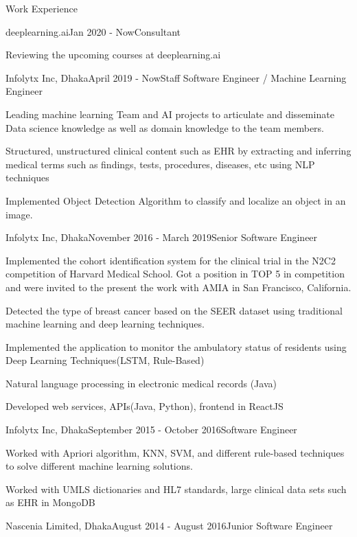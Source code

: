 \documentclass{resume} %
\begin{document}

\begin{rSection}{Work Experience}
\begin{rSubsection}{deeplearning.ai}{Jan 2020 - Now}{Consultant}{}
\item Reviewing the upcoming courses at deeplearning.ai 
\end{rSubsection}

\begin{rSubsection}{Infolytx Inc, Dhaka}{April 2019 - Now}{Staff Software Engineer / Machine Learning Engineer }{} 
\item Leading machine learning Team and AI projects to articulate and disseminate Data science knowledge as well as domain knowledge to the team members.
\item Structured, unstructured clinical content such as EHR by extracting and inferring medical terms such as findings, tests, procedures, diseases, etc using NLP techniques
\item Implemented Object Detection Algorithm to classify and localize an object in an image.
\end{rSubsection}

\begin{rSubsection}{Infolytx Inc, Dhaka}{November 2016 - March 2019}{Senior Software Engineer}{}

\item Implemented the cohort identification system for the clinical trial in the N2C2 competition of Harvard Medical School. Got a position in TOP 5 in competition and were invited to the present the work with AMIA in San Francisco, California. 
\item Detected the type of breast cancer based on the SEER dataset using traditional machine learning and deep learning techniques.
\item Implemented the application to monitor the ambulatory status of residents using Deep Learning Techniques(LSTM, Rule-Based) 
\item Natural language processing in electronic medical records (Java)
\item Developed web services, APIs(Java, Python), frontend in ReactJS

\end{rSubsection}

\begin{rSubsection}{Infolytx Inc, Dhaka}{September 2015 - October 2016}{Software Engineer}{}
\item Worked with Apriori algorithm, KNN, SVM, and different rule-based techniques to solve different machine learning solutions.
\item Worked with UMLS dictionaries and HL7 standards, large clinical data sets such as EHR in MongoDB
\end{rSubsection}
\begin{rSubsection}{Nascenia Limited, Dhaka}{August 2014 - August 2016}{Junior Software Engineer}{}


\end{rSubsection}
\end{rSection}
\end{document}
